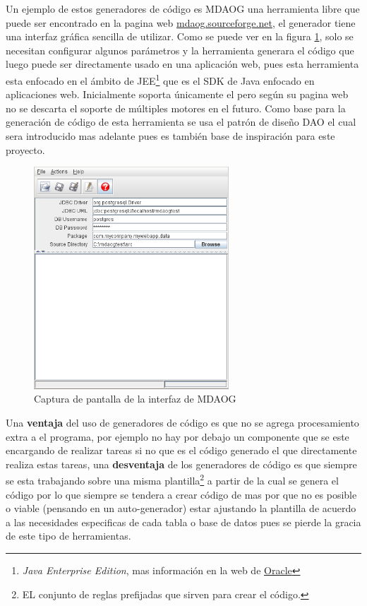 Un ejemplo de estos generadores de código es MDAOG una herramienta libre que puede ser encontrado en la pagina web \href{http://mdaog.sourceforge.net/}{mdaog.sourceforge.net}, el generador tiene una interfaz gráfica sencilla de utilizar. Como se puede ver en la figura \ref{fig:mdaog}, solo se necesitan configurar algunos parámetros y la herramienta generara el código que luego puede ser directamente usado en una aplicación web, pues esta herramienta esta enfocado en el ámbito de JEE\footnote{\textit{Java Enterprise Edition}, mas información en la web de \href{http://www.oracle.com/us/technologies/java/enterprise-edition/overview/index.html}{Oracle}} que es el SDK de Java enfocado en aplicaciones web. Inicialmente soporta únicamente el \dd \p pero según su pagina web no se descarta el soporte de múltiples motores en el futuro. Como base para la generación de código de esta herramienta se usa el patrón de diseño DAO el cual sera introducido mas adelante pues es también base de inspiración para este proyecto.  
%
\begin{figure}
  \centering
    \includegraphics[width=0.65\textwidth]{figuras/mdaogMetal.png}
  \caption{Captura de pantalla de la interfaz de MDAOG}
  \label{fig:mdaog}
\end{figure}

Una \textbf{ventaja} del uso de generadores de código es que no se agrega procesamiento extra a el programa, por ejemplo no hay por debajo un componente que se este encargando de realizar tareas si no que es el código generado el que directamente realiza estas tareas, una \textbf{desventaja} de los generadores de código es que siempre se esta trabajando sobre una misma plantilla\footnote{EL conjunto de reglas prefijadas que sirven para crear el código.} a partir de la cual se genera el código por lo que siempre se tendera a crear código de mas por que no es posible o viable (pensando en un auto-generador) estar ajustando la plantilla de acuerdo a las necesidades especificas de cada tabla o base de datos pues se pierde la gracia de este tipo de herramientas.
%
